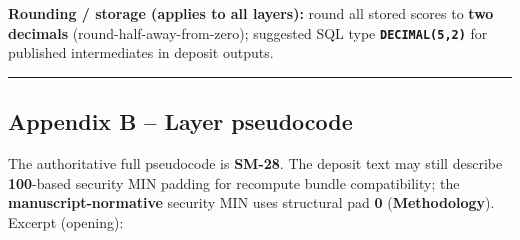 \documentclass[
  11pt,
  peerreview,journal,onecolumn]{IEEEtran}
\newcommand{\passthrough}[1]{#1}
\begin{document}
\textbf{Rounding / storage (applies to all layers):} round all stored
scores to \textbf{two decimals} (round-half-away-from-zero); suggested
SQL type \textbf{\passthrough{\lstinline!DECIMAL(5,2)!}} for published
intermediates in deposit outputs.

\begin{center}\rule{0.5\linewidth}{0.5pt}\end{center}

\hypertarget{appendix-b-layer-pseudocode}{%
\subsection{Appendix B -- Layer
pseudocode}\label{appendix-b-layer-pseudocode}}

The authoritative full pseudocode is \textbf{SM-28}. The deposit text
may still describe \textbf{100}-based security MIN padding for recompute
bundle compatibility; the \textbf{manuscript-normative} security MIN
uses structural pad \textbf{0} (\textbf{Methodology}). Excerpt
(opening):
\end{document}
